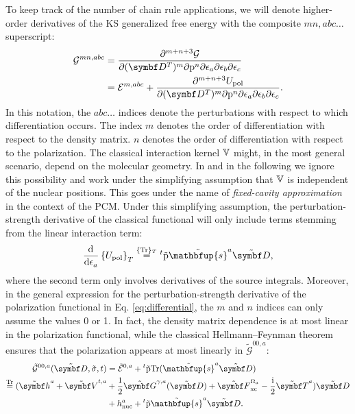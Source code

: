 To keep track of the number of chain rule applications,
we will denote higher-order derivatives of the \acrshort{KS}
generalized free energy with the composite ${mn, abc\ldots}$
superscript:
\begin{equation}\label{eq:differential}
  \begin{aligned}
  \mathcal{G}^{mn, abc}
  &=
  \frac{\partial^{m+n+3}\mathcal{G}}{\partial(\mat{D}^T)^m\partial\p^n\partial\epsilon_a\partial\epsilon_b\partial\epsilon_c}
  \\
  &=
    \mathcal{E}^{m, abc} +
  \frac{\partial^{m+n+3}U_\mathrm{pol}}{\partial(\mat{D}^T)^m\partial\p^n\partial\epsilon_a\partial\epsilon_b\partial\epsilon_c} \text{.}
  \end{aligned}
\end{equation}
In this notation, the $abc\ldots$ indices denote the perturbations with
respect to which differentiation occurs. The index $m$ denotes the order
of differentiation with respect to the density matrix. $n$
denotes the order of differentiation with respect to the
polarization.
The classical interaction kernel $\mathbb{V}$ might, in the most general
scenario, depend on the molecular geometry.
In  and in the following we ignore this possibility and work
under the simplifying assumption that $\mathbb{V}$ is independent of the nuclear
positions.
This goes under the name of \emph{fixed-cavity approximation} in the
context of the \acrshort{PCM}.\autocite{Cammi1994-qj}
Under this simplifying assumption, the perturbation-strength derivative
of the classical functional will only include terms stemming from the
linear interaction term:
\begin{equation}\label{eq:polarization-derivative}
 \deriv{}{\epsilon_a}\left\lbrace
 U_\mathrm{pol}
 \right\rbrace_T
 \eqavetr
 {}^t\tilde{\p}\tilde{\mathbfup{s}}^a\pertmat{D} \text{,}
\end{equation}
where the second term only involves derivatives of the source integrals.
Moreover, in the general expression for the perturbation-strength
derivative of the polarization functional in Eq. \eqref{eq:differential},
the $m$ and $n$ indices can only assume the values 0 or 1.
In fact, the density matrix dependence is at most linear in the
polarization functional, while the classical Hellmann--Feynman theorem
ensures that the polarization appears at most linearly in $\tilde{\mathcal{G}}^{00,a}$:
\begin{equation}\label{eq:tilde-G00-a}
  \begin{aligned}
    \tilde{\mathcal{G}}^{00,a}(\tilde{\mat{D}}, \tilde{\sigma}, t)
    &= \tilde{\mathcal{E}}^{0,a} +
    {}^t\tilde{\p}\Tr({\tilde{\mathbfup{s}}^a\pertmat{D}}) \\
  \eqtr
  (\pertmat{h}^a + \pertmat{V}^{t,a} &+ \frac{1}{2}\pertmat{G}^{\gamma, a}(\pertmat{D}) + \pertmat{F}^{\Omega_a}_\mathrm{xc}
  -\frac{\mathrm{i}}{2}\pertmat{T}^a)\pertmat{D} \\
  &+ h_\mathrm{nuc}^a + {}^t\tilde{\p}\tilde{\mathbfup{s}}^a\pertmat{D}.
  \end{aligned}
\end{equation}
